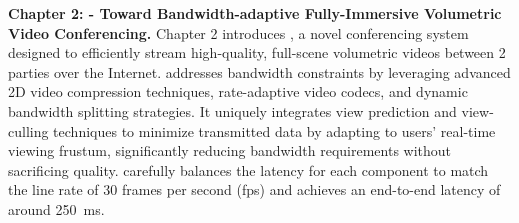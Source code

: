 \textbf{Chapter 2: \livo - Toward Bandwidth-adaptive Fully-Immersive Volumetric Video Conferencing.}
%
Chapter 2 introduces \livo, a novel conferencing system designed to efficiently stream high-quality, full-scene volumetric videos between 2 parties over the Internet.
%
\livo addresses bandwidth constraints by leveraging advanced 2D video compression techniques, rate-adaptive video codecs, and dynamic bandwidth splitting strategies.
%
It uniquely integrates view prediction and view-culling techniques to minimize transmitted data by adapting to users' real-time viewing frustum, significantly reducing bandwidth requirements without sacrificing quality. 
%
\livo carefully balances the latency for each component to match the line rate of 30 frames per second (fps) and achieves an end-to-end latency of around 250~ms.